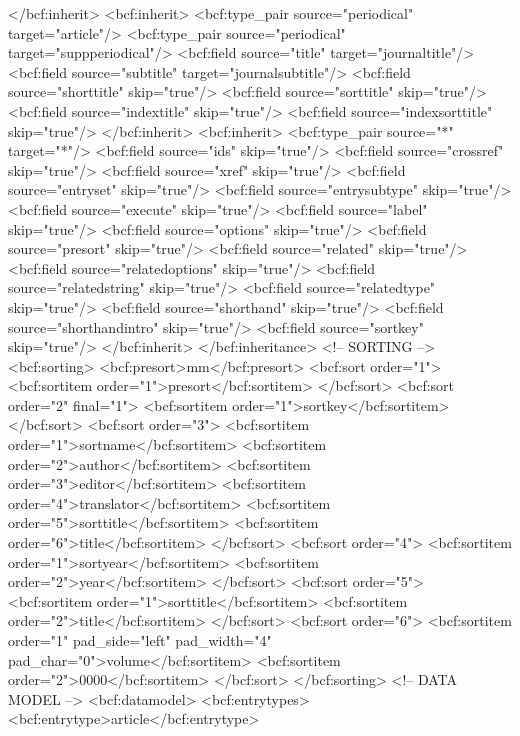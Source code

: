     </bcf:inherit>
    <bcf:inherit>
      <bcf:type_pair source="periodical" target="article"/>
      <bcf:type_pair source="periodical" target="suppperiodical"/>
      <bcf:field source="title" target="journaltitle"/>
      <bcf:field source="subtitle" target="journalsubtitle"/>
      <bcf:field source="shorttitle" skip="true"/>
      <bcf:field source="sorttitle" skip="true"/>
      <bcf:field source="indextitle" skip="true"/>
      <bcf:field source="indexsorttitle" skip="true"/>
    </bcf:inherit>
    <bcf:inherit>
      <bcf:type_pair source="*" target="*"/>
      <bcf:field source="ids" skip="true"/>
      <bcf:field source="crossref" skip="true"/>
      <bcf:field source="xref" skip="true"/>
      <bcf:field source="entryset" skip="true"/>
      <bcf:field source="entrysubtype" skip="true"/>
      <bcf:field source="execute" skip="true"/>
      <bcf:field source="label" skip="true"/>
      <bcf:field source="options" skip="true"/>
      <bcf:field source="presort" skip="true"/>
      <bcf:field source="related" skip="true"/>
      <bcf:field source="relatedoptions" skip="true"/>
      <bcf:field source="relatedstring" skip="true"/>
      <bcf:field source="relatedtype" skip="true"/>
      <bcf:field source="shorthand" skip="true"/>
      <bcf:field source="shorthandintro" skip="true"/>
      <bcf:field source="sortkey" skip="true"/>
    </bcf:inherit>
  </bcf:inheritance>
  <!-- SORTING -->
  <bcf:sorting>
    <bcf:presort>mm</bcf:presort>
    <bcf:sort order="1">
      <bcf:sortitem order="1">presort</bcf:sortitem>
    </bcf:sort>
    <bcf:sort order="2" final="1">
      <bcf:sortitem order="1">sortkey</bcf:sortitem>
    </bcf:sort>
    <bcf:sort order="3">
      <bcf:sortitem order="1">sortname</bcf:sortitem>
      <bcf:sortitem order="2">author</bcf:sortitem>
      <bcf:sortitem order="3">editor</bcf:sortitem>
      <bcf:sortitem order="4">translator</bcf:sortitem>
      <bcf:sortitem order="5">sorttitle</bcf:sortitem>
      <bcf:sortitem order="6">title</bcf:sortitem>
    </bcf:sort>
    <bcf:sort order="4">
      <bcf:sortitem order="1">sortyear</bcf:sortitem>
      <bcf:sortitem order="2">year</bcf:sortitem>
    </bcf:sort>
    <bcf:sort order="5">
      <bcf:sortitem order="1">sorttitle</bcf:sortitem>
      <bcf:sortitem order="2">title</bcf:sortitem>
    </bcf:sort>
    <bcf:sort order="6">
      <bcf:sortitem order="1" pad_side="left" pad_width="4" pad_char="0">volume</bcf:sortitem>
      <bcf:sortitem order="2">0000</bcf:sortitem>
    </bcf:sort>
  </bcf:sorting>
  <!-- DATA MODEL -->
  <bcf:datamodel>
    <bcf:entrytypes>
      <bcf:entrytype>article</bcf:entrytype>
